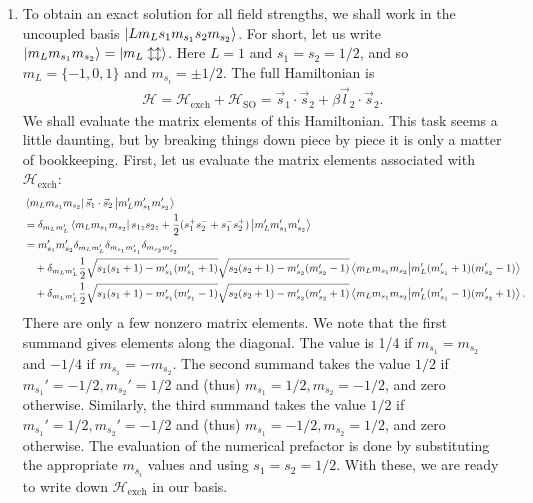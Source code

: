 \documentclass{article}
\theoremstyle{definition}
\newcommand{\ham}{\mathcal{H}}
\newcommand{\be}{\beta}
\newcommand{\f}[2]{\frac{#1}{#2}}
\begin{document}
\begin{enumerate}[label=(\alph*)]
	\newpage
	
	\item To obtain an exact solution for all field strengths, we shall work in the uncoupled basis $\ket{Lm_L s_1 m_{s_1} s_2 m_{s_2}}$. For short, let us write $\ket{m_L m_{s_1} m_{s_2}} = \ket{m_L \updownarrow\updownarrow}$. Here $L=1$ and $s_1 = s_2 = 1/2$, and so $m_L = \{-1,0,1\}$ and $m_{s_i} = \pm1/2$. The full Hamiltonian is 
	\begin{align*}
	\ham = \ham_\text{exch} + \ham_{\text{SO}} = \vec{s}_1 \cdot \vec{s}_2 + \be \vec{l}_2 \cdot \vec{s}_2.
	\end{align*}
	We shall evaluate the matrix elements of this Hamiltonian. This task seems a little daunting, but by breaking things down piece by piece it is only a matter of bookkeeping. First, let us evaluate the matrix elements associated with $\ham_\text{exch}$:
	\begin{align*}
	&\bra{m_{L} m_{s_1} m_{s_2} } \vec{s}_1 \cdot \vec{s}_2  \ket{m_{L}' m_{s_1}'  m_{s_2}'}\\
	&= \delta_{m_Lm_L'} \bra{m_{L} m_{s_1} m_{s_2} } s_{1z}s_{2z} + \f{1}{2}(s_1^+s_2^- + s_1^-s_2^+)  \ket{m_{L}' m_{s_1}'  m_{s_2}'} \\
	&= m_{s_1}'m_{s_2}' \delta_{m_Lm_L'} \delta_{m_{s_1}m_{s_1}'}\delta_{m_{s_2}m_{s_2}'}\\
	&\quad + \delta_{m_Lm_L'}\f{1}{2}\sqrt{s_1(s_1+1) - m_{s_1}'(m_{s_1}'+1)}\sqrt{s_2(s_2+1)-m_{s_2}'(m_{s_2}'-1)}\bra{m_L m_{s_1} m_{s_2}}\ket{m_L'(m_{s_1}'+1)(m_{s_2}'-1)}\\
	&\quad + \delta_{m_Lm_L'}\f{1}{2}\sqrt{s_1(s_1+1) - m_{s_1}'(m_{s_1}'-1)}\sqrt{s_2(s_2+1)-m_{s_2}'(m_{s_2}'+1)}\bra{m_L m_{s_1} m_{s_2}}\ket{m_L'(m_{s_1}'-1)(m_{s_2}'+1)}.
	\end{align*}
	There are only a few nonzero matrix elements. We note that the first summand gives elements along the diagonal. The value is 1/4 if $m_{s_1} = m_{s_2}$ and $-1/4$ if $m_{s_1} = -m_{s_2}$. The second summand takes the value $1/2$ if $m_{s_1}' = -1/2, m_{s_2}'=1/2$ and (thus) $m_{s_1} = 1/2, m_{s_2} = -1/2$, and zero otherwise. Similarly, the third summand takes the value $1/2$ if $m_{s_1}' = 1/2, m_{s_2}'= -1/2$ and (thus) $m_{s_1} = -1/2, m_{s_2} = 1/2$, and zero otherwise. The evaluation of the numerical prefactor is done by substituting the appropriate $m_{s_i}$ values and using $s_1= s_2 = 1/2$. With these, we are ready to write down $\ham_\text{exch}$ in our basis. 
	
	
	

\end{enumerate}
\end{document}
